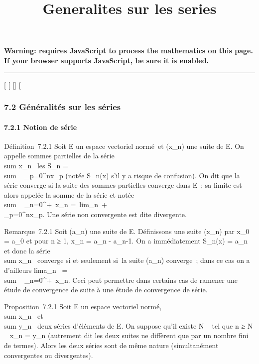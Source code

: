 \documentclass[]{article}
\title{Generalites sur les series}
\author{}
\date{}
\begin{document}
\maketitle

\textbf{Warning: 
requires JavaScript to process the mathematics on this page.\\ If your
browser supports JavaScript, be sure it is enabled.}

\begin{center}\rule{3in}{0.4pt}\end{center}

{[}
{[}
{[}{]}
{[}

\subsubsection{7.2 Généralités sur les séries}

\paragraph{7.2.1 Notion de série}

Définition~7.2.1 Soit E un espace vectoriel normé~et (x\_n) une
suite de E. On appelle sommes partielles de la série
\\sum  x\_n~ les
S\_n = \\sum ~
\_p=0^nx\_p (notée S\_n(x) s'il y a risque
de confusion). On dit que la série converge si la suite des sommes
partielles converge dans E~; sa limite est alors appelée la somme de la
série et notée \\sum ~
\_n=0^+\infty~x\_n =\
lim\_n\rightarrow~+\infty~\\\sum
 \_p=0^nx\_p. Une série non convergente est
dite divergente.

Remarque~7.2.1 Soit (a\_n) une suite de E. Définissons une suite
(x\_n) par x\_0 = a\_0 et pour n ≥ 1,
x\_n = a\_n - a\_n-1. On a immédiatement
S\_n(x) = a\_n et donc la série
\\sum  x\_n~
converge si et seulement si~la suite (a\_n) converge~; dans ce
cas on a d'ailleurs lima\_n~
= \\sum ~
\_n=0^+\infty~x\_n. Ceci peut permettre dans certains cas
de ramener une étude de convergence de suite à une étude de convergence
de série.

Proposition~7.2.1 Soit E un espace vectoriel normé,
\\sum  x\_n~ et
\\sum  y\_n~ deux
séries d'éléments de E. On suppose qu'il existe N \in {}~ tel que n ≥ N \rigtharrow~
x\_n = y\_n (autrement dit les deux suites ne diffèrent
que par un nombre fini de termes). Alors les deux séries sont de même
nature (simultanément convergentes ou divergentes).
\end{document}
